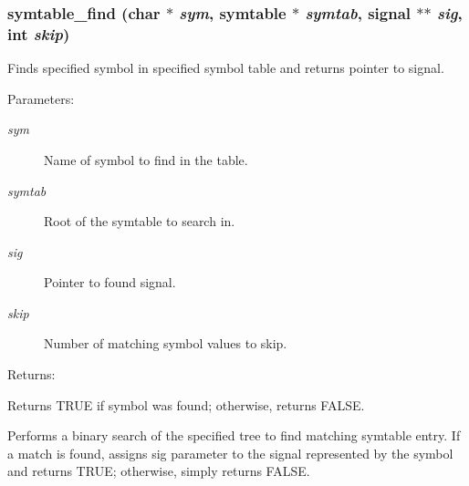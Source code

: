 \subsubsection{ symtable\_\-find (char $\ast$ {\em sym}, {\bf symtable} $\ast$ {\em symtab}, {\bf signal} $\ast$$\ast$ {\em sig}, int {\em skip})}\label{symtable_8c_a1}


Finds specified symbol in specified symbol table and returns pointer to signal.

\begin{Desc}
\item[Parameters: ]\par
\begin{description}
\item[{\em 
sym}]Name of symbol to find in the table. \item[{\em 
symtab}]Root of the symtable to search in. \item[{\em 
sig}]Pointer to found signal. \item[{\em 
skip}]Number of matching symbol values to skip.\end{description}
\end{Desc}
\begin{Desc}
\item[Returns: ]\par
Returns TRUE if symbol was found; otherwise, returns FALSE.\end{Desc}
Performs a binary search of the specified tree to find matching symtable entry. If a match is found, assigns sig parameter to the signal represented by the symbol and returns TRUE; otherwise, simply returns FALSE. 